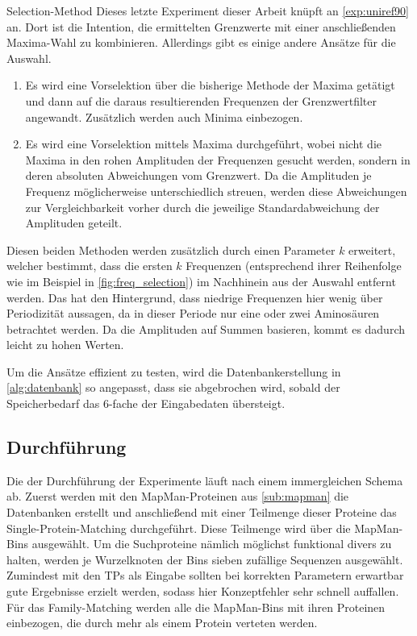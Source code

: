     \begin{experiment}{Selection-Method} %
        \label{exp:selection_method}
        Dieses letzte Experiment dieser Arbeit knüpft an \autoref{exp:uniref90} an. Dort ist die Intention, die ermittelten Grenzwerte mit einer anschließenden Maxima-Wahl zu kombinieren. Allerdings gibt es einige andere Ansätze für die Auswahl.
    
        \begin{enumerate}
            \item Es wird eine Vorselektion über die bisherige Methode der Maxima getätigt und dann auf die daraus resultierenden Frequenzen der Grenzwertfilter angewandt. Zusätzlich werden auch Minima einbezogen.
            \item Es wird eine Vorselektion mittels Maxima durchgeführt, wobei nicht die Maxima in den rohen Amplituden der Frequenzen gesucht werden, sondern in deren absoluten Abweichungen vom Grenzwert. Da die Amplituden je Frequenz möglicherweise unterschiedlich streuen, werden diese Abweichungen zur Vergleichbarkeit vorher durch die jeweilige Standardabweichung der Amplituden geteilt.
        \end{enumerate}

        Diesen beiden Methoden werden zusätzlich durch einen Parameter $k$ erweitert, welcher bestimmt, dass die ersten $k$ Frequenzen (entsprechend ihrer Reihenfolge wie im Beispiel in \autoref{fig:freq_selection}) im Nachhinein aus der Auswahl entfernt werden. Das hat den Hintergrund, dass niedrige Frequenzen hier wenig über Periodizität aussagen, da in dieser Periode nur eine oder zwei Aminosäuren betrachtet werden. Da die Amplituden auf Summen basieren, kommt es dadurch leicht zu hohen Werten.

        Um die Ansätze effizient zu testen, wird die Datenbankerstellung in \autoref{alg:datenbank} so angepasst, dass sie abgebrochen wird, sobald der Speicherbedarf das 6-fache der Eingabedaten übersteigt.
    \end{experiment}
    \subsection{Durchführung} %
        \label{sub:durchführung}
        Die der Durchführung der Experimente läuft nach einem immergleichen Schema ab. Zuerst werden mit den MapMan-Proteinen aus \autoref{sub:mapman} die Datenbanken erstellt und anschließend mit einer Teilmenge dieser Proteine das Single-Protein-Matching durchgeführt. Diese Teilmenge wird über die MapMan-Bins ausgewählt. Um die Suchproteine nämlich möglichst funktional divers zu halten, werden je Wurzelknoten der Bins sieben zufällige Sequenzen ausgewählt. Zumindest mit den \aclp{TP} als Eingabe sollten bei korrekten Parametern erwartbar gute Ergebnisse erzielt werden, sodass hier Konzeptfehler sehr schnell auffallen. Für das Family-Matching werden alle die MapMan-Bins mit ihren Proteinen einbezogen, die durch mehr als einem Protein verteten werden.


